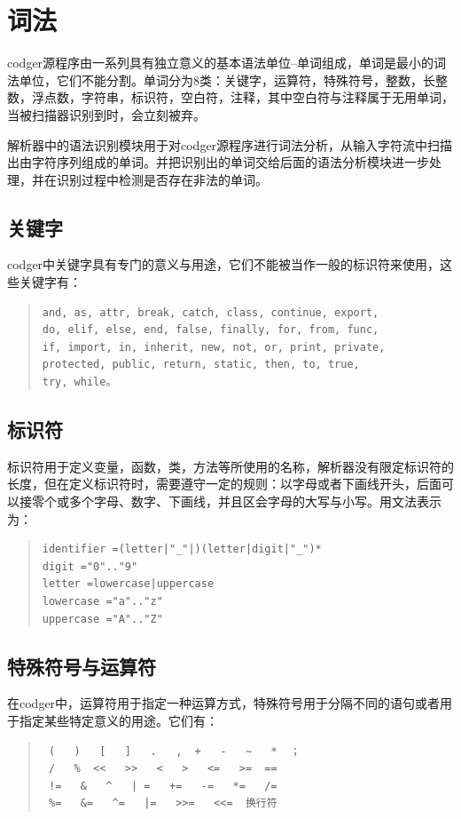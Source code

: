 \section{词法}
codger源程序由一系列具有独立意义的基本语法单位--单词组成，单词是最小的词法单位，它们不能分割。单词分为8类：关键字，运算符，特殊符号，整数，长整数，浮点数，字符串，标识符，空白符，注释，其中空白符与注释属于无用单词，当被扫描器识别到时，会立刻被弃。

解析器中的语法识别模块用于对codger源程序进行词法分析，从输入字符流中扫描出由字符序列组成的单词。并把识别出的单词交给后面的语法分析模块进一步处理，并在识别过程中检测是否存在非法的单词。
\subsection{关键字}
codger中关键字具有专门的意义与用途，它们不能被当作一般的标识符来使用，这些关键字有：
\begin{quote}
\begin{verbatim}
and, as, attr, break, catch, class, continue, export,
do, elif, else, end, false, finally, for, from, func, 
if, import, in, inherit, new, not, or, print, private, 
protected, public, return, static, then, to, true,
try, while。
\end{verbatim}
\end{quote}
\subsection{标识符}
标识符用于定义变量，函数，类，方法等所使用的名称，解析器没有限定标识符的长度，但在定义标识符时，需要遵守一定的规则：以字母或者下画线开头，后面可以接零个或多个字母、数字、下画线，并且区会字母的大写与小写。用文法表示为：
\begin{quote}
\begin{verbatim}
identifier =(letter|"_"|)(letter|digit|"_")*
digit ="0".."9"
letter =lowercase|uppercase
lowercase ="a".."z"
uppercase ="A".."Z"
\end{verbatim}
\end{quote}
\subsection{特殊符号与运算符}
在codger中，运算符用于指定一种运算方式，特殊符号用于分隔不同的语句或者用于指定某些特定意义的用途。它们有：
\begin{quote}
\begin{verbatim}
 (   )   [   ]   .   ,  +   -   ~   *  ；
 /   %  <<   >>   <   >   <=   >=  ==
 !=   &   ^   | =   +=   -=   *=   /= 
 %=   &=   ^=   |=   >>=   <<=  换行符
\end{verbatim}
\end{quote}

